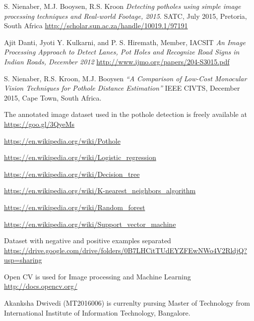 \documentclass[journal]{IEEEtran}
\begin{document}
\ifCLASSOPTIONcaptionsoff
  \newpage
\fi

\begin{thebibliography}{1}

S. Nienaber, M.J. Booysen, R.S. Kroon
\textit{Detecting potholes using simple image processing techniques and Real-world Footage, 2015}. 
SATC, July 2015, Pretoria, South Africa
\url{http://scholar.sun.ac.za/handle/10019.1/97191}
 
Ajit Danti, Jyoti Y. Kulkarni, and P. S. Hiremath, Member, IACSIT
\textit{An Image Processing Approach to Detect Lanes, Pot Holes and Recognize Road Signs in Indian Roads, December 2012}
\url{http://www.ijmo.org/papers/204-S3015.pdf}

S. Nienaber, R.S. Kroon, M.J. Booysen  
\textit{“A Comparison of Low-Cost Monocular Vision Techniques for Pothole Distance Estimation”}
IEEE CIVTS, December 2015, Cape Town, South Africa.
 
The annotated image dataset used in the pothole detection is freely available at
\url{https://goo.gl/3QyeMs}

\url{https://en.wikipedia.org/wiki/Pothole}

\url{https://en.wikipedia.org/wiki/Logistic_regression}

\url{https://en.wikipedia.org/wiki/Decision_tree}

\url{https://en.wikipedia.org/wiki/K-nearest_neighbors_algorithm}

\url{https://en.wikipedia.org/wiki/Random_forest}

\url{https://en.wikipedia.org/wiki/Support_vector_machine}

Dataset with negative and positive examples separated
\url{https://drive.google.com/drive/folders/0B7LHCitTUdEYZFEwNWo4V2RldjQ?usp=sharing}

Open CV is used for Image processing and Machine Learning
\url{http://docs.opencv.org/}

\end{thebibliography}

\begin{IEEEbiography}{Akanksha Dwivedi}
(MT2016006) is currenlty pursing Master of Technology from International Institute of Information Technology, Bangalore. 
\end{IEEEbiography}
\end{document}

